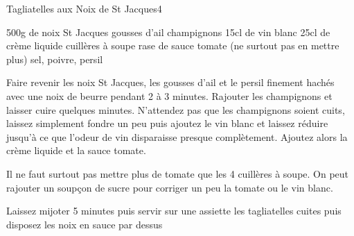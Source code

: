 \begin{recette}{Tagliatelles aux Noix de St Jacques}{4}{}{}
\begin{ingredients}
\ingredient 500g de noix St Jacques
 gousses d'ail
 champignons
\ingredient 15cl de vin blanc
\ingredient 25cl de crème liquide
 cuillères à soupe rase de sauce tomate (ne surtout pas en mettre plus)
\ingredient sel, poivre, persil
\end{ingredients}

\begin{preparation}
\etape Faire revenir les noix St Jacques, les gousses d'ail et le persil finement hachés avec une noix de beurre pendant 2 à 3 minutes.
\etape Rajouter les champignons et laisser cuire quelques minutes. N'attendez pas que les champignons soient cuits, laissez simplement fondre un peu puis ajoutez le vin blanc et laissez réduire jusqu'à ce que l'odeur de vin disparaisse presque complètement.
\etape Ajoutez alors la crème liquide et la sauce tomate.
\begin{remarque}
Il ne faut surtout pas mettre plus de tomate que les 4 cuillères à soupe. On peut rajouter un soupçon de sucre pour corriger un peu la tomate ou le vin blanc.
\end{remarque}
\etape Laissez mijoter 5 minutes puis servir sur une assiette les tagliatelles cuites puis disposez les noix en sauce par dessus
\end{preparation}

\end{recette}

